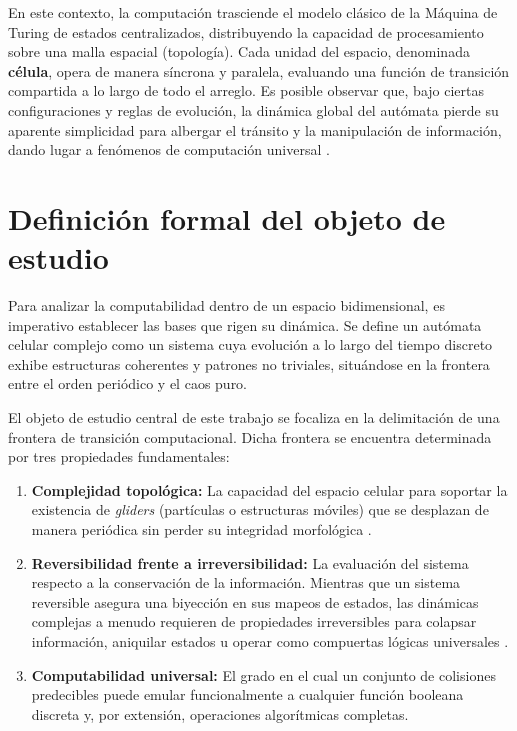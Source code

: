 En este contexto, la computación trasciende el modelo clásico de la Máquina de Turing de estados centralizados, distribuyendo la capacidad de procesamiento sobre una malla espacial (topología). Cada unidad del espacio, denominada \textbf{célula}, opera de manera síncrona y paralela, evaluando una función de transición compartida a lo largo de todo el arreglo. Es posible observar que, bajo ciertas configuraciones y reglas de evolución, la dinámica global del autómata pierde su aparente simplicidad para albergar el tránsito y la manipulación de información, dando lugar a fenómenos de computación universal \cite{Wolfram2002}.

\section{Definición formal del objeto de estudio}
\label{sec:objeto_estudio}

Para analizar la computabilidad dentro de un espacio bidimensional, es imperativo establecer las bases que rigen su dinámica. Se define un autómata celular complejo como un sistema cuya evolución a lo largo del tiempo discreto exhibe estructuras coherentes y patrones no triviales, situándose en la frontera entre el orden periódico y el caos puro.

El objeto de estudio central de este trabajo se focaliza en la delimitación de una frontera de transición computacional. Dicha frontera se encuentra determinada por tres propiedades fundamentales:

\begin{enumerate}
    \item \textbf{Complejidad topológica:} La capacidad del espacio celular para soportar la existencia de \textit{gliders} (partículas o estructuras móviles) que se desplazan de manera periódica sin perder su integridad morfológica \cite{Wuensche1998}.
    \item \textbf{Reversibilidad frente a irreversibilidad:} La evaluación del sistema respecto a la conservación de la información. Mientras que un sistema reversible asegura una biyección en sus mapeos de estados, las dinámicas complejas a menudo requieren de propiedades irreversibles para colapsar información, aniquilar estados u operar como compuertas lógicas universales \cite{Toffoli1987}.
    \item \textbf{Computabilidad universal:} El grado en el cual un conjunto de colisiones predecibles puede emular funcionalmente a cualquier función booleana discreta y, por extensión, operaciones algorítmicas completas.
\end{enumerate}

